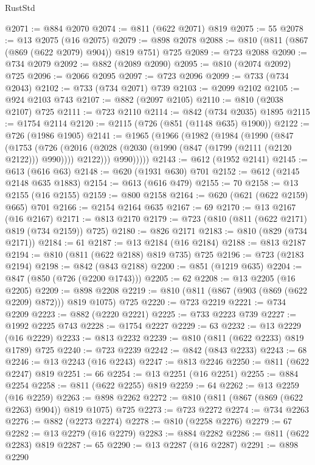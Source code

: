 \begin{lexlean}{RustStd}
\begin{coremodule}
@2071 := @884 @2070
@2074 := @811 (@622 @2071) @819
@2075 := 55
@2078 := @13 @2075 (@16 @2075)
@2079 := @898 @2078
@2088 := @810 (@811 (@867 (@869 (@622 @2079) @904)) @819 @751) @725
@2089 := @723 @2088
@2090 := @734 @2079
@2092 := @882 (@2089 @2090)
@2095 := @810 (@2074 @2092) @725
@2096 := @2066 @2095
@2097 := @723 @2096
@2099 := @733 (@734 @2043)
@2102 := @733 (@734 @2071) @739
@2103 := @2099 @2102
@2105 := @924 @2103 @743
@2107 := @882 (@2097 @2105)
@2110 := @810 (@2038 @2107) @725
@2111 := @723 @2110
@2114 := @842 (@734 @2035) @1895
@2115 := @1754 @2114
@2120 := @2115 (@726 (@851 (@1148 @635) @1900))
@2122 := @726 (@1986 @1905)
@2141 := @1965
    (@1966
      (@1982
        (@1984
          (@1990
            (@847
              (@1753
                (@726
                  (@2016 (@2028 (@2030 (@1990 (@847 (@1799 (@2111 (@2120 @2122))) @990)))) @2122)))
              @990)))))
@2143 := @612 (@1952 @2141)
@2145 := @613 (@616 @63)
@2148 := @620 (@1931 @630) @701
@2152 := @612 (@2145 @2148 @635 @1883)
@2154 := @613 (@616 @479)
@2155 := 70
@2158 := @13 @2155 (@16 @2155)
@2159 := @800 @2158
@2164 := @620 (@621 (@622 @2159) @665) @701
@2166 := @2154 @2164 @635
@2167 := 69
@2170 := @13 @2167 (@16 @2167)
@2171 := @813 @2170
@2179 := @723 (@810 (@811 (@622 @2171) @819 (@734 @2159)) @725)
@2180 := @826 @2171
@2183 := @810 (@829 (@734 @2171))
@2184 := 61
@2187 := @13 @2184 (@16 @2184)
@2188 := @813 @2187
@2194 := @810 (@811 (@622 @2188) @819 @735) @725
@2196 := @723 (@2183 @2194)
@2198 := @842 (@843 @2188)
@2200 := @851 (@1219 @635)
@2204 := @847 (@850 (@726 (@2200 @1743)))
@2205 := 62
@2208 := @13 @2205 (@16 @2205)
@2209 := @898 @2208
@2219 := @810 (@811 (@867 (@903 (@869 (@622 @2209) @872))) @819 @1075) @725
@2220 := @723 @2219
@2221 := @734 @2209
@2223 := @882 (@2220 @2221)
@2225 := @733 @2223 @739
@2227 := @1992 @2225 @743
@2228 := @1754 @2227
@2229 := 63
@2232 := @13 @2229 (@16 @2229)
@2233 := @813 @2232
@2239 := @810 (@811 (@622 @2233) @819 @1789) @725
@2240 := @723 @2239
@2242 := @842 (@843 @2233)
@2243 := 68
@2246 := @13 @2243 (@16 @2243)
@2247 := @813 @2246
@2250 := @811 (@622 @2247) @819
@2251 := 66
@2254 := @13 @2251 (@16 @2251)
@2255 := @884 @2254
@2258 := @811 (@622 @2255) @819
@2259 := 64
@2262 := @13 @2259 (@16 @2259)
@2263 := @898 @2262
@2272 := @810 (@811 (@867 (@869 (@622 @2263) @904)) @819 @1075) @725
@2273 := @723 @2272
@2274 := @734 @2263
@2276 := @882 (@2273 @2274)
@2278 := @810 (@2258 @2276)
@2279 := 67
@2282 := @13 @2279 (@16 @2279)
@2283 := @884 @2282
@2286 := @811 (@622 @2283) @819
@2287 := 65
@2290 := @13 @2287 (@16 @2287)
@2291 := @898 @2290

\end{coremodule}
\end{lexlean}

